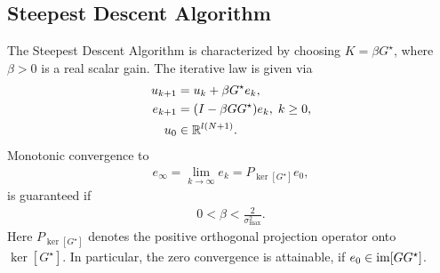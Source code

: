 \subsection{Steepest Descent Algorithm}
\begin{alg}
	\label{alg: SDA}
	The Steepest Descent Algorithm is characterized by choosing $K = \beta G^\star$, where $\beta>0$ is a real scalar gain. The iterative law is given via 
	\begin{align}
	\label{eq:errSDA}
	\begin{split}
	u_{k+1} &= u_k + \beta G^\star e_k,\\
	e_{k+1} &= (I- \beta G G^\star) e_{k}, \; k\geq 0,\\
	u_0 &\in {\mathbb{R}}^{l (N+1)}. 
	\end{split}
	\end{align}
	Monotonic convergence to 
	\begin{align}
	\label{eq:SDAErrLim} 
	e_\infty  = \lim_{k\to\infty} e_k = P_{\ker[G^\star]}e_0,
	\end{align} 
	is guaranteed if
	\begin{align*}
	0 <\beta < \frac{2}{\sigma_{\max}^2}.
	\end{align*}
	Here $P_{\ker[G^\star]}$ denotes the positive orthogonal projection operator onto $\ker[G^\star]$.
	In particular, the zero convergence is attainable, if $e_0 \in \operatorname{im} [G G^\star]$. 
\end{alg} 
